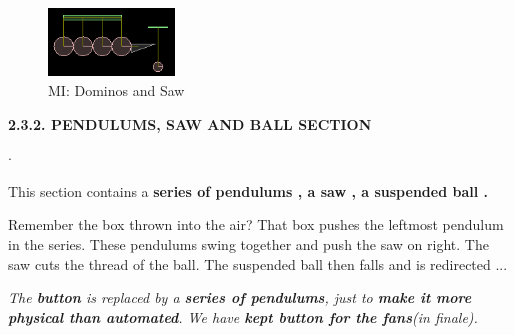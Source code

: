 \documentclass{report}
\begin{document}
\begin{figure}
\begin{center}
\includegraphics[width=0.3\textwidth, height=0.2\textwidth]{latex/box2d_2.png}
\end{center}
\caption{MI: Dominos and Saw}
\end{figure}
\textbf{2.3.2. PENDULUMS, SAW AND  BALL SECTION}
\begin{list}{$\cdot$}{\setlength{\leftmargin}{0em}}
\item This section contains a \textbf{ series of pendulums \cite{pendulum}, a saw \cite{motor_joint}, a suspended ball \cite{contact_listener}.} 
\item Remember the box thrown into the air? That box pushes the leftmost pendulum in the series. These pendulums swing together and push the saw on right. The saw cuts the thread of the ball. The suspended ball then falls and is redirected ...
\item \emph{The \textbf{button} is replaced by a \textbf{series of pendulums}, just to \textbf{make it more physical than automated}. We have \textbf{kept button for the fans}(in finale).}\\
\end{list}
\end{document}
